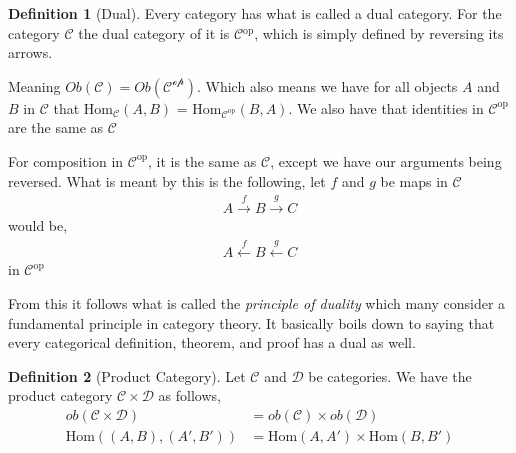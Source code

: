 \documentclass[12pt]{article}
\theoremstyle{definition}
\newtheorem{definition}{Definition}[section]
\theoremstyle{remark}
\begin{document}
    \begin{definition}[Dual]
        Every category has what is called a dual category. For the category $\mathcal{C}$ the dual category of it is $\mathcal{C}$$^{\text{op}}$, which is simply defined by reversing its arrows. 

        Meaning $\textit{Ob}(\mathcal{C}) = \textit{Ob}(\mathcal{C^{\text{op}}})$. Which also means we have for all objects $A$ and $B$ in $\mathcal{C}$ that Hom$_{\mathcal{C}}(A,B)$ = Hom$_{\mathcal{C}^{\text{op}}}(B,A)$. We also have that identities in $\mathcal{C}^{\text{op}}$ are the same as $\mathcal{C}$

        For composition in $\mathcal{C}^{\text{op}}$, it is the same as $\mathcal{C}$, except we have our arguments being reversed. What is meant by this is the following, let $f$ and $g$ be maps in $\mathcal{C}$
        \begin{align*}
            A \stackrel{f}{\to} B \stackrel{g}{\to} C
        \end{align*}
        would be,
        \begin{align*}
            A \stackrel{f}{\leftarrow} B \stackrel{g}{\leftarrow} C 
        \end{align*}
        in $\mathcal{C}^\text{op}$
    \end{definition}

    From this it follows what is called the \textit{principle of duality} which many consider a fundamental principle in category theory. It basically boils down to saying that every categorical definition, theorem, and proof has a dual as well. 

    \begin{definition}[Product Category]
        Let $\mathcal{C}$ and $\mathcal{D}$ be categories. We have the product category $\mathcal{C}\times\mathcal{D}$ as follows,
        \begin{align*}
            ob(\mathcal{C} \times \mathcal{D}) &= ob(\mathcal{C}) \times ob(\mathcal{D}) \\
            \text{Hom}((A,B),(A', B')) &= \text{Hom}(A,A')\times \text{Hom}(B,B')
        \end{align*}
    \end{definition}
\end{document}
